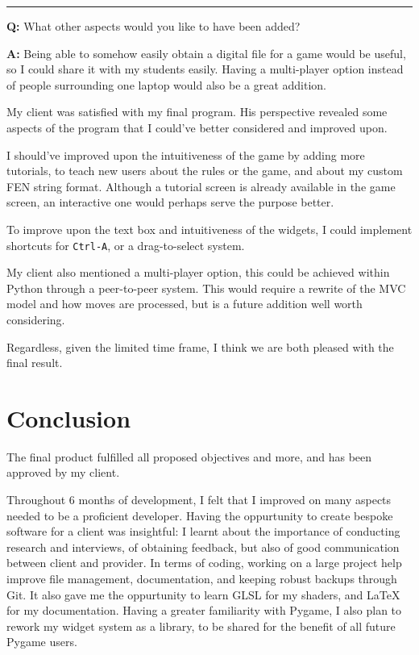 \documentclass[../main/main.tex]{subfiles}
\begin{document}
\noindent\rule{\textwidth}{0.4pt}

\noindent\textbf{Q:} What other aspects would you like to have been added?

\noindent\textbf{A:} Being able to somehow easily obtain a digital file for a game would be useful, so I could share it with my students easily. Having a multi-player option instead of people surrounding one laptop would also be a great addition.

\bigskip

My client was satisfied with my final program. His perspective revealed some aspects of the program that I could've better considered and improved upon.

I should've improved upon the intuitiveness of the game by adding more tutorials, to teach new users about the rules or the game, and about my custom FEN string format. Although a tutorial screen is already available in the game screen, an interactive one would perhaps serve the purpose better.

To improve upon the text box and intuitiveness of the widgets, I could implement shortcuts for \verb|Ctrl-A|, or a drag-to-select system.

My client also mentioned a multi-player option, this could be achieved within Python through a peer-to-peer system. This would require a rewrite of the MVC model and how moves are processed, but is a future addition well worth considering.

Regardless, given the limited time frame, I think we are both pleased with the final result.

\section{Conclusion}
The final product fulfilled all proposed objectives and more, and has been approved by my client.

Throughout 6 months of development, I felt that I improved on many aspects needed to be a proficient developer. Having the oppurtunity to create bespoke software for a client was insightful: I learnt about the importance of conducting research and interviews, of obtaining feedback, but also of good communication between client and provider. In terms of coding, working on a large project help improve file management, documentation, and keeping robust backups through Git. It also gave me the oppurtunity to learn GLSL for my shaders, and LaTeX for my documentation. Having a greater familiarity with Pygame, I also plan to rework my widget system as a library, to be shared for the benefit of all future Pygame users.
\end{document}
